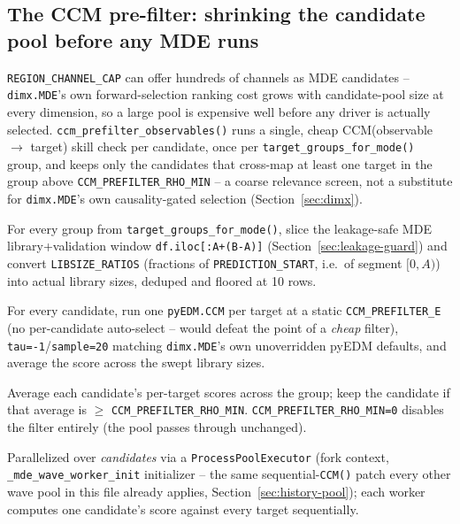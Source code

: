 \documentclass[11pt]{article}
\begin{document}
\subsection{The CCM pre-filter: shrinking the candidate pool before any MDE runs}
\label{sec:ccm-prefilter}
\texttt{REGION\_CHANNEL\_CAP} can offer hundreds of channels as MDE candidates -- \texttt{dimx.MDE}'s own forward-selection ranking cost grows with candidate-pool size at every dimension, so a large pool is expensive well before any driver is actually selected. \texttt{ccm\_prefilter\_observables()} runs a single, cheap CCM(observable $\to$ target) skill check per candidate, once per \texttt{target\_groups\_for\_mode()} group, and keeps only the candidates that cross-map at least one target in the group above \texttt{CCM\_PREFILTER\_RHO\_MIN} -- a coarse relevance screen, not a substitute for \texttt{dimx.MDE}'s own causality-gated selection (Section~\ref{sec:dimx}).

\begin{steps}
\item For every group from \texttt{target\_groups\_for\_mode()}, slice the leakage-safe MDE library+validation window \texttt{df.iloc[:A+(B{-}A)]} (Section~\ref{sec:leakage-guard}) and convert \texttt{LIBSIZE\_RATIOS} (fractions of \texttt{PREDICTION\_START}, i.e.\ of segment $[0,A)$) into actual library sizes, deduped and floored at 10 rows.
\item For every candidate, run one \texttt{pyEDM.CCM} per target at a static \texttt{CCM\_PREFILTER\_E} (no per-candidate auto-select -- would defeat the point of a \emph{cheap} filter), \texttt{tau=-1}/\texttt{sample=20} matching \texttt{dimx.MDE}'s own unoverridden pyEDM defaults, and average the score across the swept library sizes.
\item Average each candidate's per-target scores across the group; keep the candidate if that average is $\geq$ \texttt{CCM\_PREFILTER\_RHO\_MIN}. \texttt{CCM\_PREFILTER\_RHO\_MIN=0} disables the filter entirely (the pool passes through unchanged).
\item Parallelized over \emph{candidates} via a \texttt{ProcessPoolExecutor} (fork context, \texttt{\_mde\_wave\_worker\_init} initializer -- the same sequential-\texttt{CCM()} patch every other wave pool in this file already applies, Section~\ref{sec:history-pool}); each worker computes one candidate's score against every target sequentially.
\end{steps}
\end{document}
